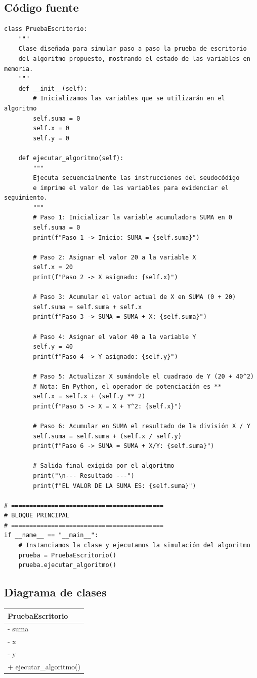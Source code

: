 \documentclass[11pt, a4paper]{article}
\newcommand{\clasebox}[3]{%
\begin{center}
\begin{tabular}{|l|}
\hline
\textbf{#1} \\
\hline
#2
\hline
#3
\hline
\end{tabular}
\end{center}
}
\begin{document}
\subsection{Código fuente}
\begin{lstlisting}
class PruebaEscritorio:
    """
    Clase diseñada para simular paso a paso la prueba de escritorio 
    del algoritmo propuesto, mostrando el estado de las variables en memoria.
    """
    def __init__(self):
        # Inicializamos las variables que se utilizarán en el algoritmo
        self.suma = 0
        self.x = 0
        self.y = 0

    def ejecutar_algoritmo(self):
        """
        Ejecuta secuencialmente las instrucciones del seudocódigo
        e imprime el valor de las variables para evidenciar el seguimiento.
        """
        # Paso 1: Inicializar la variable acumuladora SUMA en 0
        self.suma = 0
        print(f"Paso 1 -> Inicio: SUMA = {self.suma}")

        # Paso 2: Asignar el valor 20 a la variable X
        self.x = 20
        print(f"Paso 2 -> X asignado: {self.x}")

        # Paso 3: Acumular el valor actual de X en SUMA (0 + 20)
        self.suma = self.suma + self.x
        print(f"Paso 3 -> SUMA = SUMA + X: {self.suma}")

        # Paso 4: Asignar el valor 40 a la variable Y
        self.y = 40
        print(f"Paso 4 -> Y asignado: {self.y}")

        # Paso 5: Actualizar X sumándole el cuadrado de Y (20 + 40^2)
        # Nota: En Python, el operador de potenciación es **
        self.x = self.x + (self.y ** 2)
        print(f"Paso 5 -> X = X + Y^2: {self.x}")

        # Paso 6: Acumular en SUMA el resultado de la división X / Y
        self.suma = self.suma + (self.x / self.y)
        print(f"Paso 6 -> SUMA = SUMA + X/Y: {self.suma}")

        # Salida final exigida por el algoritmo
        print("\n--- Resultado ---")
        print(f"EL VALOR DE LA SUMA ES: {self.suma}")

# ==========================================
# BLOQUE PRINCIPAL
# ==========================================
if __name__ == "__main__":
    # Instanciamos la clase y ejecutamos la simulación del algoritmo
    prueba = PruebaEscritorio()
    prueba.ejecutar_algoritmo()
\end{lstlisting}

\subsection{Diagrama de clases}
\clasebox{PruebaEscritorio}
{%
- suma \\
- x \\
- y \\
}
{%
+ ejecutar\_algoritmo() \\
}
\end{document}
